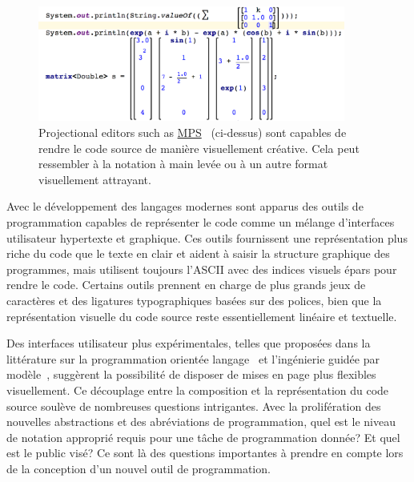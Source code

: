 {\begin{figure}
\centering
\includegraphics[width=0.90\textwidth]{../figures/mps_screenshot.png}
\caption{Projectional editors such as \href{https://www.jetbrains.com/mps/}{MPS}~\citep{voelter2010language, pech2013jetbrains} (ci-dessus) sont capables de rendre le code source de manière visuellement créative. Cela peut ressembler à la notation à main levée ou à un autre format visuellement attrayant.}
\label{fig:mps_screenshot}
\end{figure}

Avec le développement des langages modernes sont apparus des outils de programmation capables de représenter le code comme un mélange d'interfaces utilisateur hypertexte et graphique. Ces outils fournissent une représentation plus riche du code que le texte en clair et aident à saisir la structure graphique des programmes, mais utilisent toujours l'ASCII avec des indices visuels épars pour rendre le code. Certains outils prennent en charge de plus grands jeux de caractères et des ligatures typographiques basées sur des polices, bien que la représentation visuelle du code source reste essentiellement linéaire et textuelle.

Des interfaces utilisateur plus expérimentales, telles que proposées dans la littérature sur la programmation orientée langage~\citep{dmitriev2004language} et l'ingénierie guidée par modèle~\citep{famelis2015mummint}, suggèrent la possibilité de disposer de mises en page plus flexibles visuellement. Ce découplage entre la composition et la représentation du code source soulève de nombreuses questions intrigantes. Avec la prolifération des nouvelles abstractions et des abréviations de programmation, quel est le niveau de notation approprié requis pour une tâche de programmation donnée? Et quel est le public visé? Ce sont là des questions importantes à prendre en compte lors de la conception d'un nouvel outil de programmation.

}

